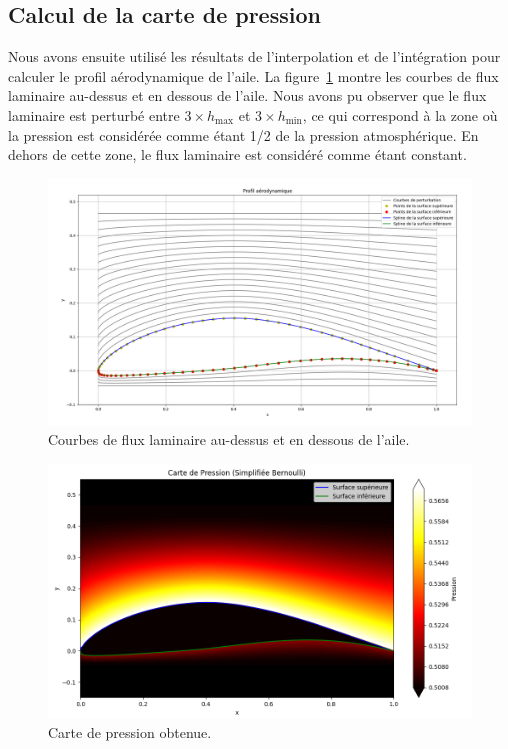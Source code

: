 \documentclass{article}
\begin{document}
\subsection{Calcul de la carte de pression}
Nous avons ensuite utilisé les résultats de l'interpolation et de l'intégration pour calculer le profil aérodynamique de l'aile. La figure~\ref{fig:disturbence_curves} montre les courbes de flux laminaire au-dessus et en dessous de l'aile. Nous avons pu observer que le flux laminaire est perturbé entre $3\times h_{\text{max}}$ et $3\times h_{\text{min}}$, ce qui correspond à la zone où la pression est considérée comme étant 1/2 de la pression atmosphérique. En dehors de cette zone, le flux laminaire est considéré comme étant constant.\\
\begin{minipage}{0.5\textwidth}
  \begin{figure}[H]
    \centering
    \includegraphics[width=\textwidth]{disturbence_cruves.png}
    \caption{Courbes de flux laminaire au-dessus et en dessous de l'aile.}
    \label{fig:disturbence_curves}
  \end{figure}
\end{minipage}
\hfill
\begin{minipage}{0.5\textwidth}
  \begin{figure}[H]
    \centering
    \includegraphics[width=\textwidth]{pressure_map.png}
    \caption{Carte de pression obtenue.}
    \label{fig:pressure_map}
  \end{figure}
\end{minipage}
\end{document}
